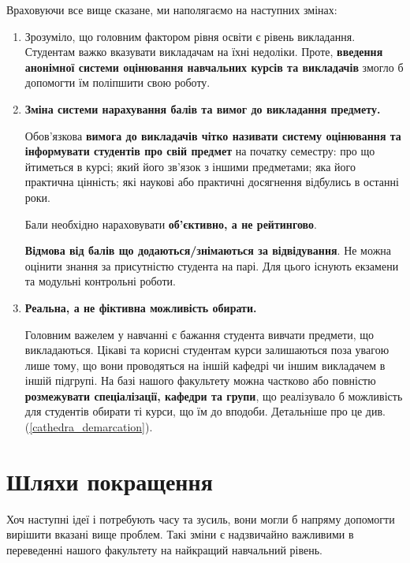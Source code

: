 \documentclass[14pt, a4paper]{extarticle}  %
\begin{document}
Враховуючи все вище сказане, ми наполягаємо на наступних змінах:
\begin{enumerate}
    \item  
    Зрозуміло, що головним фактором рівня освіти є рівень викладання. Студентам важко вказувати викладачам на їхні недоліки. Проте, \textbf{ введення анонімної системи оцінювання навчальних курсів та викладачів} змогло б допомогти їм поліпшити свою роботу. 
    
    \item  \textbf{Зміна системи нарахування балів та вимог до викладання предмету.}
    
    Обов'язкова \textbf{вимога до викладачів чітко називати систему оцінювання та інформувати студентів про свій предмет} на початку семестру: про що йтиметься в курсі; який його зв'язок з іншими предметами; яка його практична цінність; які наукові або практичні досягнення відбулись в останні роки.
    
    Бали необхідно нараховувати \textbf{об'єктивно, а не рейтингово}.
    
    \textbf{Відмова від балів що додаються/знімаються за відвідування}. Не можна оцінити знання за присутністю студента на парі. Для цього існують екзамени та модульні контрольні роботи.
    
    \item \textbf{Реальна, а не фіктивна можливість обирати.} 
    
    Головним важелем у навчанні є бажання студента вивчати предмети, що викладаються. Цікаві та корисні студентам курси залишаються поза увагою лише тому, що вони проводяться на іншій кафедрі чи іншим викладачем в іншій підгрупі. На базі нашого факультету можна частково або повністю \textbf{розмежувати спеціалізації, кафедри та групи}, що реалізувало б можливість для студентів обирати ті курси, що їм до вподоби. Детальніше про це див. (\ref{cathedra_demarcation}). 
\end{enumerate}

\newpage
\section{Шляхи покращення}

Хоч наступні ідеї і потребують часу та зусиль, вони могли б напряму допомогти  вирішити вказані вище проблем. Такі зміни є надзвичайно важливими в переведенні нашого факультету на найкращий навчальний рівень.
\end{document}
